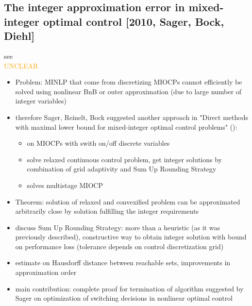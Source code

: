 \documentclass{article}
\begin{document}
\subsection{The integer approximation error in mixed-integer optimal control [2010, Sager, Bock, Diehl]}
see \cite{sager2012integer}\\
\textcolor{orange}{UNCLEAR}
\begin{itemize}
\item Problem: MINLP that come from discretizing MIOCPs cannot efficiently be solved using nonlinear BnB or outer approximation (due to large number of integer variables)
\item therefore Sager, Reinelt, Bock suggested another approach in "Direct methods with maximal lower bound for mixed-integer optimal control problems" (\cite{sager2009direct}):
	\begin{itemize}
	\item on MIOCPs with swith on/off discrete variables
	\item solve relaxed continuous control problem, get integer solutions by combination of grid adaptivity and Sum Up Rounding Strategy
	\item solves multistage MIOCP
\end{itemize}	 
\item Theorem: solution of relaxed and convexified problem can be approximated arbitrarily close by solution fulfilling the integer requirements
\item discuss Sum Up Rounding Strategy: more than a heuristic (as it was previously described), constructive way to obtain integer solution with bound on performance loss (tolerance depends on control discretization grid)
\item estimate on Hausdorff distance between reachable sets, improvements in approximation order
\item main contribution: complete proof for termination of algorithm suggested by Sager on optimization of switching decisions in nonlinear optimal control
\end{itemize}
\end{document}
